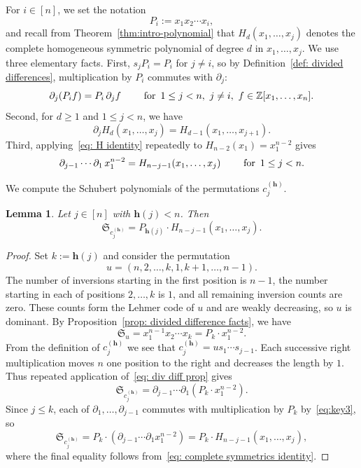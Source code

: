 \documentclass[11pt]{amsart}
\theoremstyle{plain}
\newtheorem{lem}[thm]{Lemma}
\theoremstyle{definition}
\newcommand{\hess}{{\mathbf h}}
\newcommand{\Z}{\mathbb{ Z}}           %
\numberwithin{equation}{section}
\begin{document}
For $i\in[n]$, we set the notation \[P_i:=x_1x_2\cdots x_i,\] and recall from Theorem~\ref{thm:intro-polynomial} that $H_d(x_1,\ldots,x_j)$ denotes the complete homogeneous symmetric polynomial of degree $d$ in $x_1,\ldots,x_j$. We use three elementary facts. First, $s_jP_i=P_i$ for $j\neq i$, so by Definition~\ref{def: divided differences}, multiplication by $P_i$ commutes with $\partial_j$:
\begin{equation}\label{eq:key3}
\partial_j(P_if)=P_i\,\partial_jf \qquad \textup{ for } \, 1\leq j<n,\ j\neq i,\ f\in\Z[x_1,\ldots,x_n].
\end{equation}
Second, for $d\geq 1$ and $1\leq j<n$, we have~\cite[(3.9)]{Macdonald1991}
\begin{equation}\label{eq: H identity}
\partial_j H_{d}(x_1,\ldots, x_j)=H_{d-1}(x_1,\ldots, x_{j+1}).
\end{equation}
Third, applying~\eqref{eq: H identity} repeatedly to $H_{n-2}(x_1)=x_1^{n-2}$ gives
\begin{equation}\label{eq: complete symmetrics identity}
\partial_{j-1}\cdots\partial_1\,x_1^{n-2}=H_{n-j-1}(x_1,\ldots, x_j) \qquad \textup{ for } \, 1\leq j < n.
\end{equation}


We compute the Schubert polynomials of the permutations $c_j^{(\hess)}$.

\begin{lem}\label{lem: formula Schubert c j hess}
Let $j\in[n]$ with $\hess(j)<n$. Then
\begin{equation*}
\mathfrak{S}_{c_j^{(\hess)}}=P_{\hess(j)}\cdot H_{n-j-1}(x_1,\ldots,x_j).
\end{equation*}
\end{lem}

\begin{proof}
Set $k:=\hess(j)$ and consider the permutation
\[
u=(n,2,\ldots,k,1,k+1,\ldots,n-1).
\]
The number of inversions starting in the first position is $n-1$, the number starting in each of positions $2,\ldots,k$ is $1$, and all remaining inversion counts are zero. These counts form the Lehmer code of $u$ and are weakly decreasing, so $u$ is dominant. By Proposition~\ref{prop: divided difference facts}, we have
\[
\mathfrak{S}_u=x_1^{n-1}x_2\cdots x_k=P_k\cdot x_1^{n-2}.
\]
From the definition of $c_j^{(\hess)}$ we see that $c_j^{(\hess)}=us_1\cdots s_{j-1}$. Each successive right multiplication moves $n$ one position to the right and decreases the length by $1$. Thus repeated application of~\eqref{eq: div diff prop} gives
\[
\mathfrak{S}_{c_j^{(\hess)}}=\partial_{j-1}\cdots\partial_1(P_k\cdot x_1^{n-2}).
\]
Since $j\leq k$, each of $\partial_1,\ldots,\partial_{j-1}$ commutes with multiplication by $P_k$ by~\eqref{eq:key3}, so
\[
\mathfrak{S}_{c_j^{(\hess)}}=P_k\cdot(\partial_{j-1}\cdots\partial_1x_1^{n-2})
=P_k\cdot H_{n-j-1}(x_1,\ldots,x_j),
\]
where the final equality follows from~\eqref{eq: complete symmetrics identity}.
\end{proof}
\end{document}

